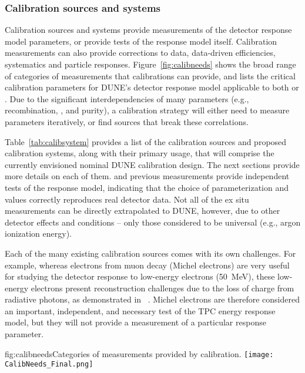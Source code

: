 \subsubsection{Calibration sources and systems}

Calibration sources and systems provide measurements of the detector response model parameters, or provide tests of the response model itself. Calibration measurements can also provide corrections to data, data-driven efficiencies, systematics and particle responses. 
Figure~\ref{fig:calibneeds} shows the broad range of categories of measurements that calibrations can provide, and lists the critical calibration parameters for DUNE's detector response model applicable to both  or . Due to the significant interdependencies of many parameters (e.g., recombination, \efield, and \lar purity), a calibration strategy will either need to  measure parameters iteratively, or find sources that break these correlations.

Table~\ref{tab:calibsystem} provides a list of the calibration sources and proposed calibration systems, along with their primary usage, that will comprise the currently envisioned nominal DUNE  calibration design. 
The next sections provide more details on each of them.  and previous measurements provide independent tests of the response model, indicating that the choice of parameterization and values correctly reproduces real detector data. 
Not all of the ex situ measurements can be directly extrapolated to DUNE, however, due to other detector effects and conditions -- only those considered to be universal (e.g., argon ionization energy). 

Each of the many existing calibration sources comes with its own challenges. For example, whereas electrons from muon decay (Michel electrons) are very useful for studying the detector response to low-energy electrons (\SI{50}{\MeV}), these low-energy electrons present reconstruction challenges due to the loss of charge from radiative photons, as demonstrated in ~\cite{Acciarri:2017sjy}.  
Michel electrons are therefore considered an important, independent, and necessary test of the TPC energy response model, but they will not provide a measurement of a particular response parameter.
\begin{dunefigure}{fig:calibneeds}{Categories of measurements provided by calibration.}
\texttt{[image: CalibNeeds\_Final.png]}
\end{dunefigure}

